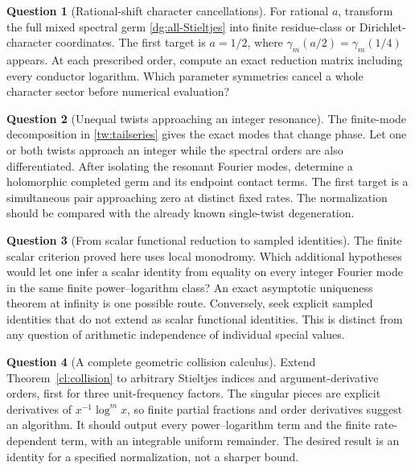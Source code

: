 \documentclass[11pt,a4paper]{article}
\numberwithin{equation}{section}
\theoremstyle{definition}
\newtheorem{question}{Question}
\theoremstyle{remark}
\begin{document}
\begin{question}[Rational-shift character cancellations]
For rational $a$, transform the full mixed spectral germ
\eqref{dg:all-Stieltjes} into finite residue-class or
Dirichlet-character coordinates. The first target is $a=1/2$,
where $\gamma_m(a/2)=\gamma_m(1/4)$ appears. At each prescribed
order, compute an exact reduction matrix including every
conductor logarithm. Which parameter symmetries cancel a
whole character sector before numerical evaluation?
\end{question}

\begin{question}[Unequal twists approaching an integer resonance]
The finite-mode decomposition in \eqref{tw:tailseries} gives
the exact modes that change phase. Let one or both twists
approach an integer while the spectral orders are also
differentiated. After isolating the resonant Fourier modes,
determine a holomorphic completed germ and its endpoint contact
terms. The first target is a simultaneous pair approaching
zero at distinct fixed rates. The normalization should be
compared with the already known single-twist degeneration.
\end{question}

\begin{question}[From scalar functional reduction to sampled identities]
The finite scalar criterion proved here uses local monodromy.
Which additional hypotheses would let one infer a scalar
identity from equality on every integer Fourier mode in the
same finite power--logarithm class? An exact asymptotic uniqueness
theorem at infinity is one possible route. Conversely, seek
explicit sampled identities that do not extend as scalar
functional identities. This is distinct from any question of
arithmetic independence of individual special values.
\end{question}

\begin{question}[A complete geometric collision calculus]
Extend Theorem~\ref{cl:collision} to arbitrary Stieltjes indices
and argument-derivative orders, first for three unit-frequency
factors. The singular pieces are explicit derivatives of
$x^{-1}\log^m x$, so finite partial fractions and order
derivatives suggest an algorithm. It should output every
power--logarithm term and the finite rate-dependent term, with
an integrable uniform remainder. The desired result is an
identity for a specified normalization, not a sharper bound.
\end{question}
\end{document}
